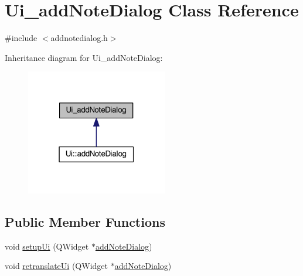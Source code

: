 \hypertarget{classUi__addNoteDialog}{}\section{Ui\+\_\+add\+Note\+Dialog Class Reference}
\label{classUi__addNoteDialog}


{\ttfamily \#include $<$addnotedialog.\+h$>$}



Inheritance diagram for Ui\+\_\+add\+Note\+Dialog\+:
\nopagebreak
\begin{figure}[H]
\begin{center}
\leavevmode
\includegraphics[width=175pt]{classUi__addNoteDialog__inherit__graph}
\end{center}
\end{figure}
\subsection*{Public Member Functions}
\begin{DoxyCompactItemize}
\item 
void \hyperlink{classUi__addNoteDialog_a2487f1cd1542da959f06b7412e80ef0b}{setup\+Ui} (Q\+Widget $\ast$\hyperlink{classaddNoteDialog}{add\+Note\+Dialog})
\item 
void \hyperlink{classUi__addNoteDialog_aab12c63dbd7ceae65cefd5be2a09c2ab}{retranslate\+Ui} (Q\+Widget $\ast$\hyperlink{classaddNoteDialog}{add\+Note\+Dialog})
\end{DoxyCompactItemize}
